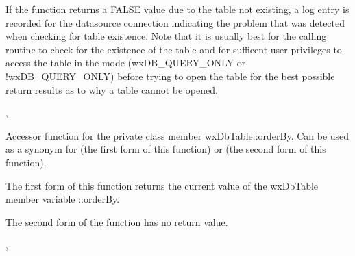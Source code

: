 If the function returns a FALSE value due to the table not existing, a log 
entry is recorded for the datasource connection indicating the problem 
that was detected when checking for table existence.  Note that it is usually 
best for the calling routine to check for the existence of the table and for 
sufficent user privileges to access the table in the mode (wxDB_QUERY_ONLY or 
!wxDB_QUERY_ONLY) before trying to open the table for the best possible 
return results as to why a table cannot be opened.


, 


\label{wxdbtableorderby}


Accessor function for the private class member wxDbTable::orderBy.  Can be 
used as a synonym for  
(the first form of this function) or  
(the second form of this function).




The first form of this function returns the current value of the wxDbTable 
member variable ::orderBy.  

The second form of the function has no return value.


, 


\label{wxdbtablequery}



